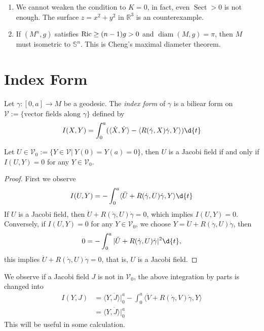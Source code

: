 \begin{rem}
    \begin{enumerate}[(1)]
        \item We cannot weaken the condition to $K=0$, in fact, even $\operatorname{Sect}>0$ is not enough.
        The surface $z=x^2+y^2$ in $\mathbb{R}^3$ is an counterexample.
        \item If $(M^n,g)$ satisfies $\operatorname{Ric}\geq(n-1)g>0$ and $\operatorname{diam}(M,g)=\pi$, then $M$ must isometric to $\mathbb{S}^n$.
        This is Cheng's maximal diameter theorem.
    \end{enumerate}
\end{rem}

\section{Index Form}

\begin{defn}
    Let $\gamma:[0,a]\to M$ be a geodesic.
    The \emph{index form} of $\gamma$ is a biliear form on $\mathscr{V}:=\{\text{vector fields along }\gamma\}$ defined by
    \[I(X,Y)=\int_0^a(\langle\dot{X},\dot{Y}\rangle-\langle R(\dot{\gamma},{X})\dot{\gamma},{Y}\rangle)\d{t}\]
\end{defn}

\begin{lem}\label{jacobi field and index form}
    Let $U\in\mathscr{V}_0:=\{Y\in\mathscr{V}|\ Y(0)=Y(a)=0\}$, then $U$ is a Jacobi field if and only if $I(U,Y)=0$ for any $Y\in\mathscr{V}_0$.
\end{lem}
\begin{proof}
    First we observe
    \[I(U,Y)=-\int_0^a\langle\ddot{U}+R(\dot{\gamma},U)\dot{\gamma},Y\rangle\d{t}\]
    If $U$ is a Jacobi field, then $\ddot{U}+R(\dot{\gamma},U)\dot{\gamma}=0$, which implies $I(U,Y)=0$.
    Conversely, if $I(U,Y)=0$ for any $Y\in\mathscr{V}_0$, we choose $Y=\ddot{U}+R(\dot{\gamma},U)\dot{\gamma}$, then
    \[0=-\int_0^a|\ddot{U}+R(\dot{\gamma},U)\dot{\gamma}|^2\d{t},\]
    this implies $\ddot{U}+R(\dot{\gamma},U)\dot{\gamma}=0$, that is, $U$ is a Jacobi field.
\end{proof}

We observe if a Jacobi field $J$ is not in $\mathscr{V}_0$, the above integration by parts is changed into
\begin{equation}
    \begin{aligned}
        I(Y,J)&=\langle Y,\dot{J}\rangle|_0^a-\int_0^a\langle\ddot{V}+R(\dot{\gamma},V)\dot{\gamma},Y\rangle\\
        &=\langle Y,\dot{J}\rangle|_0^a
    \end{aligned}\label{jacobi field and index form 2}
\end{equation}
This will be useful in some calculation.

